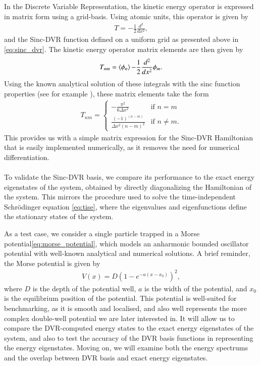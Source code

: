 \documentclass{subfiles}
\begin{document}
In the Discrete Variable Representation, the kinetic energy operator is expressed in matrix form using a grid-basis. Using atomic units, this operator is given by
\begin{align*}
    T = -\frac{1}{2} \frac{d^2}{dx^2} ,
\end{align*}
and the Sinc-DVR function defined on a uniform grid as presented above in \eqref{eq:sinc_dvr}. The kinetic energy operator matrix elements are then given by
\begin{align*}
    T_{nm} = \braket{\phi_n}{-\frac{1}{2} \frac{d^2}{dx^2}}{\phi_m}.
\end{align*}
Using the known analytical solution of these integrals with the sinc function properties (see for example \cite{colbert1992novel}), these matrix elements take the form 
\begin{align*}
    T_{nm} = \begin{cases}
        -\frac{\pi^2}{6\Delta x^2} & \text{if } n = m \\
        \frac{(-1)^(n-m)}{\Delta x^2(n - m)^2} & \text{if } n \neq m.
    \end{cases}
\end{align*}
This provides us with a simple matrix expression for the Sinc-DVR Hamiltonian that is easily implemented numerically, as it removes the need for numerical differentiation.
\\ \\
To validate the Sinc-DVR basis, we compare its performance to the exact energy eigenstates of the system, obtained by directly diagonalizing the Hamiltonian of the system. This mirrors the procedure used to solve the time-independent Schrödinger equation \eqref{eq:tise}, where the eigenvalues and eigenfunctions define the stationary states of the system.

As a test case, we consider a single particle trapped in a Morse potential\eqref{eq:morse_potential}, which models an anharmonic bounded oscillator potential with well-known analytical and numerical solutions. A brief reminder, the Morse potential is given by
\begin{align*}
    V(x) = D \left(1 - e^{-a(x - x_0)}\right)^2,
\end{align*}
where $D$ is the depth of the potential well, $a$ is the width of the potential, and $x_0$ is the equilibrium position of the potential. This potential is well-suited for benchmarking, as it is smooth and localised, and also well represents the more complex double-well potential we are later interested in. It will allow us to compare the DVR-computed energy states to the exact energy eigenstates of the system, and also to test the accuracy of the DVR basis functions in representing the energy eigenstates. Moving on, we will examine both the energy spectrums and the overlap between DVR basis and exact energy eigenstates. 
\end{document}
